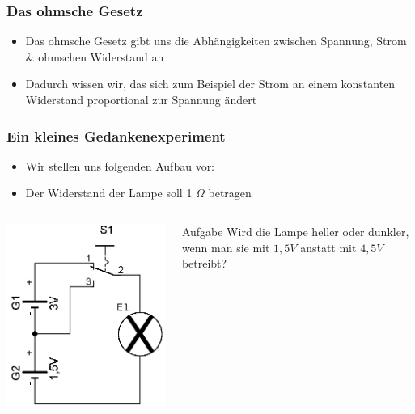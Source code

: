 \begin{frame}
	\frametitle{Das ohmsche Gesetz}
	\begin{itemize}
		\item	Das ohmsche Gesetz gibt uns die Abhängigkeiten zwischen Spannung, Strom \& ohmschen Widerstand an
		\item	Dadurch wissen wir, das sich zum Beispiel der Strom an einem konstanten Widerstand proportional zur Spannung ändert
	\end{itemize}
\end{frame}

\begin{frame}
	\frametitle{Ein kleines Gedankenexperiment}
	\begin{itemize}
		\item	Wir stellen uns folgenden Aufbau vor:
		\item	Der Widerstand der Lampe soll 1 $\Omega$ betragen
	\end{itemize}
    \begin{columns}
           \begin{center}
                   \includegraphics[scale=1]{e03/Strom_Spannung_Abh.png}
           \end{center}
           \begin{exampleblock}{Aufgabe}
             Wird die Lampe heller oder dunkler, wenn man sie mit $1,5 V$ anstatt mit $4,5 V$ betreibt?
           \end{exampleblock}
       \end{columns}

\end{frame}

